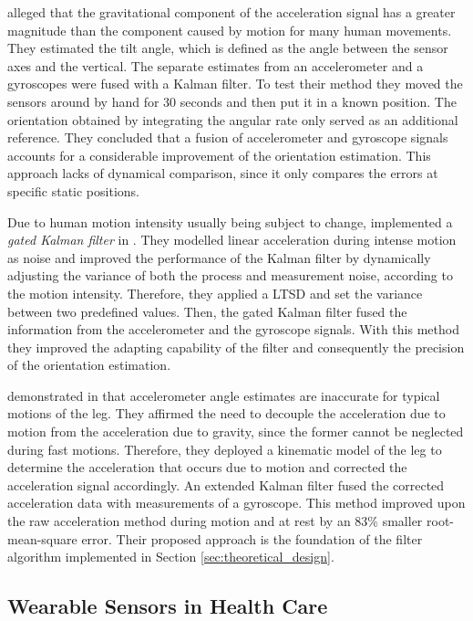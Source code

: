 \citeauthor{Luinge_orientation_acc_gyro_99} \cite{Luinge_orientation_acc_gyro_99} alleged that the gravitational component of the acceleration signal has a greater magnitude than the component caused by motion for many human movements. They estimated the tilt angle, which is defined as the angle between the sensor axes and the vertical. The separate estimates from an accelerometer and a gyroscopes were fused with a Kalman filter. To test their method they moved the sensors around by hand for 30 seconds and then put it in a known position. The orientation obtained by integrating the angular rate only served as an additional reference. They concluded that a fusion of accelerometer and gyroscope signals accounts for a considerable improvement of the orientation estimation. This approach lacks of dynamical comparison, since it only compares the errors at specific static positions.

Due to human motion intensity usually being subject to change, \citeauthor{olivares_vicente_signal_2013} implemented a \emph{gated Kalman filter} in \cite{olivares_vicente_signal_2013}. They modelled linear acceleration during intense motion as noise and improved the performance of the Kalman filter by dynamically adjusting the variance of both the process and measurement noise, according to the motion intensity. Therefore, they applied a \gls{LTSD} and set the variance between two predefined values. Then, the gated Kalman filter fused the information from the accelerometer and the gyroscope signals. With this method they improved the adapting capability of the filter and consequently the precision of the orientation estimation.

\citeauthor{bennett_motion_2014} demonstrated in \cite{bennett_motion_2014} that accelerometer angle estimates are inaccurate for typical motions of the leg. They affirmed the need to decouple the acceleration due to motion from the acceleration due to gravity, since the former cannot be neglected during fast motions. Therefore, they deployed a kinematic model of the leg to determine the acceleration that occurs due to motion and corrected the acceleration signal accordingly. An extended Kalman filter fused the corrected acceleration data with measurements of a gyroscope. This method improved upon the raw acceleration method during motion and at rest by an 83\% smaller root-mean-square error. Their proposed approach is the foundation of the filter algorithm implemented in Section \ref{sec:theoretical_design}.

\subsection{Wearable Sensors in Health Care}\label{sec:MARG_sensors_medical}

